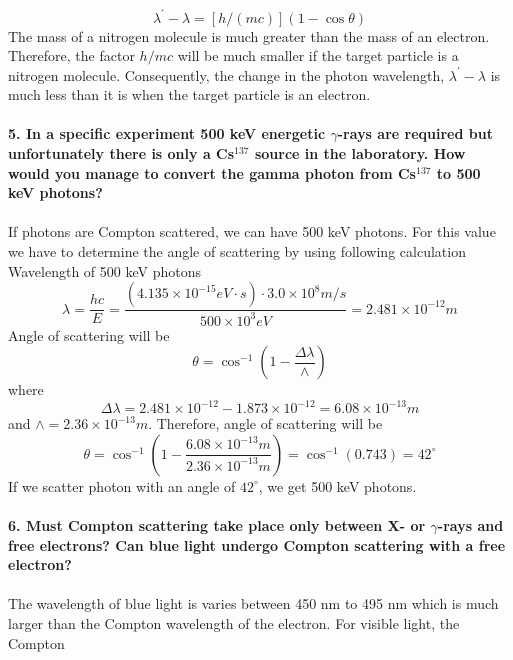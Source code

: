 \documentclass[a4paper,12pt]{article}
\begin{document}
\begin{equation}
\lambda^{\prime}-\lambda=[h/(mc)](1-\cos \theta)
\end{equation}
The mass of a nitrogen molecule is much greater than the mass of an electron.  Therefore, the factor $h/mc$ will be much smaller if the target particle is a nitrogen molecule.  Consequently, the change in the photon wavelength, $\lambda^{\prime}-\lambda$ is much less than it is when the target particle is an electron.\\\\
\textbf{5. In a specific experiment 500 keV energetic $\gamma$-rays are required but unfortunately there is only a Cs$^{137}$ source in the laboratory. How would you manage to convert the gamma photon from Cs$^{137}$ to 500 keV photons?}\\\\
If photons are Compton scattered, we can have 500 keV photons. For this value we have to determine the angle of scattering by using following calculation\\
Wavelength of 500 keV photons
\begin{equation}
\lambda=\frac{hc}{E}=\frac{(4.135\times 10^{-15} eV\cdot s)\cdot 3.0\times 10^{8}m/s}{500\times 10^{3} eV}=2.481\times 10^{-12} m
\end{equation}
Angle of scattering will be
\begin{equation}
\theta = \cos ^{-1}(1-\frac{\Delta \lambda }{\wedge})
\end{equation}
where
\begin{equation}
\Delta \lambda = 2.481\times 10^{-12}-1.873\times 10^{-12}=6.08\times 10^{-13} m
\end{equation} 
and $\wedge=2.36\times 10^{-13} m$. Therefore, angle of scattering will be
\begin{equation}
\theta = \cos ^{-1}(1-\frac{6.08\times 10^{-13} m}{2.36\times 10^{-13} m})=\cos ^{-1}(0.743)=42^{\circ}
\end{equation}
If we scatter photon with an angle of $42^{\circ}$, we get 500 keV photons.\\\\
\textbf{6. Must Compton scattering take place only between X- or $\gamma$-rays and free electrons? Can blue light undergo Compton scattering with a free electron?}\\\\
The wavelength of blue light is varies between 450 nm to 495 nm which is much larger than the Compton wavelength of the electron. For visible light, the Compton
\end{document}
